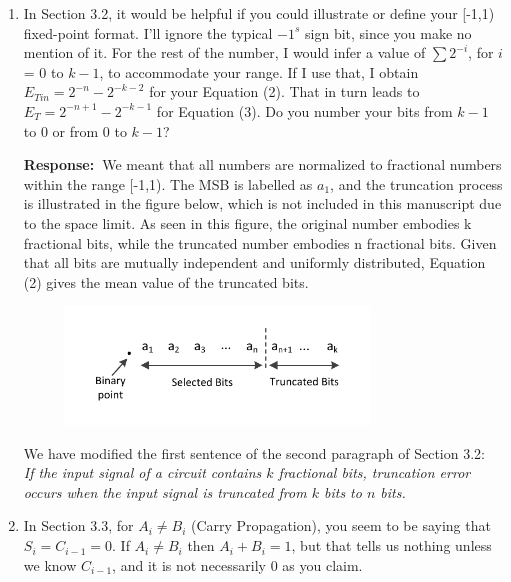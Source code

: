 \documentclass[a4paper, 11pt]{article}
\def\Response{\noindent \textbf{Response:~}}
\newcommand{\Question}[1]{\textcolor[rgb]{0.51,0.00,0.00}{#1}}
\newcommand{\PaperText}[1]{\emph{#1}}
\begin{document}
\begin{enumerate}
  \item \Question{In Section 3.2, it would be helpful if you could illustrate or define your [-1,1) fixed-point format. I'll ignore the typical ${-1}^s$ sign bit, since you make no mention of it.  For the rest of the number, I would infer a value of $\sum2^{-i}$, for $i$ = 0 to $k-1$, to accommodate your range.  If I use that, I obtain $E_{Tin} = 2^{-n} - 2^{-k-2}$ for your Equation (2).  That in turn leads to $E_T = 2^{-n+1} - 2^{-k-1}$ for Equation (3). Do you number your bits from $k-1$ to 0 or from 0 to $k-1$?}
      
      
      
      \Response We meant that all numbers are normalized to fractional numbers within the range [-1,1). The MSB is labelled as $a_1$, and the truncation process is illustrated in the figure below, which is not included in this manuscript due to the space limit. As seen in this figure, the original number embodies k fractional bits, while the truncated number embodies n fractional bits. Given that all bits are mutually independent and uniformly distributed, Equation (2) gives the mean value of the truncated bits. 
      
      \begin{figure}[htbp]
        \centering
        \includegraphics[width=3.2in]{./Figure/Truncation.pdf}
      \end{figure}
      
      We have modified the first sentence of the second paragraph of Section 3.2:\\
      
      \PaperText{If the input signal of a circuit contains $k$ fractional bits, truncation error occurs when the input signal is truncated from $k$ bits to $n$ bits.}\\
      
  \item \Question{In Section 3.3, for $A_i\neq B_i$ (Carry Propagation), you seem to be saying that $S_i = C_{i-1} = 0$.  If $A_i \neq B_i$ then $A_i + B_i = 1$, but that tells us nothing unless we know $C_{i-1}$, and it is not necessarily 0 as you claim.}
      

\end{enumerate}
\end{document}
